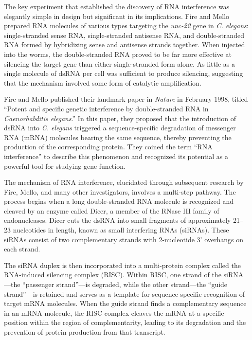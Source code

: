 The key experiment that established the discovery of RNA interference was elegantly simple in design but significant in its implications. Fire and Mello prepared RNA molecules of various types targeting the \textit{unc-22} gene in \textit{C. elegans}: single-stranded sense RNA, single-stranded antisense RNA, and double-stranded RNA formed by hybridizing sense and antisense strands together. When injected into the worms, the double-stranded RNA proved to be far more effective at silencing the target gene than either single-stranded form alone. As little as a single molecule of dsRNA per cell was sufficient to produce silencing, suggesting that the mechanism involved some form of catalytic amplification.

Fire and Mello published their landmark paper in \textit{Nature} in February 1998, titled ``Potent and specific genetic interference by double-stranded RNA in \textit{Caenorhabditis elegans}.'' In this paper, they proposed that the introduction of dsRNA into \textit{C. elegans} triggered a sequence-specific degradation of messenger RNA (mRNA) molecules bearing the same sequence, thereby preventing the production of the corresponding protein. They coined the term ``RNA interference'' to describe this phenomenon and recognized its potential as a powerful tool for studying gene function.

The mechanism of RNA interference, elucidated through subsequent research by Fire, Mello, and many other investigators, involves a multi-step pathway. The process begins when a long double-stranded RNA molecule is recognized and cleaved by an enzyme called Dicer, a member of the RNase III family of endonucleases. Dicer cuts the dsRNA into small fragments of approximately 21--23 nucleotides in length, known as small interfering RNAs (siRNAs). These siRNAs consist of two complementary strands with 2-nucleotide 3' overhangs on each strand.

The siRNA duplex is then incorporated into a multi-protein complex called the RNA-induced silencing complex (RISC). Within RISC, one strand of the siRNA---the ``passenger strand''---is degraded, while the other strand---the ``guide strand''---is retained and serves as a template for sequence-specific recognition of target mRNA molecules. When the guide strand finds a complementary sequence in an mRNA molecule, the RISC complex cleaves the mRNA at a specific position within the region of complementarity, leading to its degradation and the prevention of protein production from that transcript.

